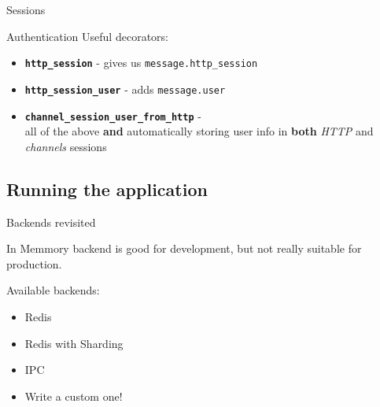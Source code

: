 \documentclass{beamer}
\begin{document}
\begin{frame}[fragile]{Sessions}
\end{frame}

\begin{frame}{Authentication}
	Useful decorators:
	\begin{itemize}
		\item{\textbf{\texttt{http\_session}}}
		- gives us \texttt{message.http\_session}
		\item \textbf{\texttt{http\_session\_user}} - adds \texttt{message.user}		
		\item \textbf{\texttt{channel\_session\_user\_from\_http}} -\\ all of the above \textbf{and} automatically storing user info in \textbf{both} \textit{HTTP} and \textit{channels} sessions
	\end{itemize}
\end{frame}

\subsection{Running the application}

\begin{frame}{Backends revisited}
\begin{adjustwidth}{2em}{2.5em}
	In Memmory backend is good for development, but not really suitable for production.
	
\vspace{1em}

Available backends:
	\begin{itemize}
		\item Redis
		\item Redis with Sharding
		\item IPC
		\item Write a custom one!
	\end{itemize}
\end{adjustwidth}
\end{frame}
\end{document}
